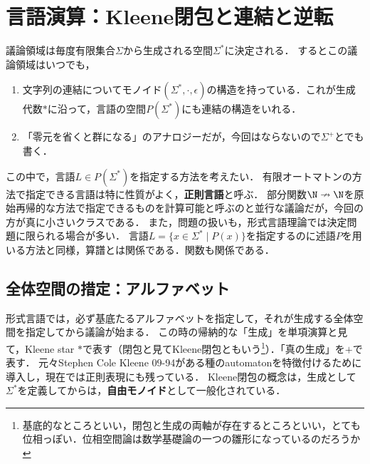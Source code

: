 \section{言語演算：Kleene閉包と連結と逆転}

\begin{tcolorbox}[colframe=ForestGreen, colback=ForestGreen!10!white, breakable,
    title=議論領域は有限生成される空間，関係による指定が言語，その関係を特性関数とみるか算譜とみるか]
    議論領域は毎度有限集合$\Sigma$から生成される空間$\Sigma^*$に決定される．
    するとこの議論領域はいつでも，
    \begin{enumerate}
        \item 文字列の連結についてモノイド$(\Sigma^*,\cdot,\epsilon)$の構造を持っている．これが生成代数$*$に沿って，言語の空間$P(\Sigma^*)$にも連結の構造をいれる．
        \item 「零元を省くと群になる」のアナロジーだが，今回はならないので$\Sigma^+$とでも書く．
    \end{enumerate}
    この中で，言語$L\in P(\Sigma^*)$を指定する方法を考えたい．
    有限オートマトンの方法で指定できる言語は特に性質がよく，\textbf{正則言語}と呼ぶ．
    部分関数$\N\nrightarrow\N$を原始再帰的な方法で指定できるものを計算可能と呼ぶのと並行な議論だが，今回の方が真に小さいクラスである．
    また，問題の扱いも，形式言語理論では決定問題に限られる場合が多い．
    言語$L=\{x\in\Sigma^*\mid P(x)\}$を指定するのに述語$P$を用いる方法と同様，算譜とは関係である．関数も関係である．
\end{tcolorbox}

\subsection{全体空間の措定：アルファベット}

\begin{tcolorbox}[colframe=ForestGreen, colback=ForestGreen!10!white, breakable]
    形式言語では，必ず基底たるアルファベットを指定して，それが生成する全体空間を指定してから議論が始まる．
    この時の帰納的な「生成」を単項演算と見て，Kleene star $*$で表す（閉包と見てKleene閉包ともいう\footnote{基底的なところといい，閉包と生成の両軸が存在するところといい，とても位相っぽい．位相空間論は数学基礎論の一つの雛形になっているのだろうか}）．「真の生成」を$+$で表す．
    元々Stephen Cole Kleene 09-94がある種のautomatonを特徴付けるために導入し，現在では正則表現にも残っている．
    Kleene閉包の概念は，生成として$\Sigma^*$を定義してからは，\textbf{自由モノイド}として一般化されている．
\end{tcolorbox}

